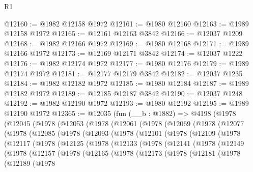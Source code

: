 \begin{lexlean}{R1}
\begin{coremodule}
@12160 := @1982 @12158 @1972
@12161 := @1980 @12160
@12163 := @1989 @12158 @1972
@12165 := @12161 @12163 @3842
@12166 := @12037 @1209
@12168 := @1982 @12166 @1972
@12169 := @1980 @12168
@12171 := @1989 @12166 @1972
@12173 := @12169 @12171 @3842
@12174 := @12037 @1222
@12176 := @1982 @12174 @1972
@12177 := @1980 @12176
@12179 := @1989 @12174 @1972
@12181 := @12177 @12179 @3842
@12182 := @12037 @1235
@12184 := @1982 @12182 @1972
@12185 := @1980 @12184
@12187 := @1989 @12182 @1972
@12189 := @12185 @12187 @3842
@12190 := @12037 @1248
@12192 := @1982 @12190 @1972
@12193 := @1980 @12192
@12195 := @1989 @12190 @1972
@12365 := @12035
    (fun (__b : @1882) =>
    @4198
      (@1978
        (@12045
          (@1978
            (@12053
              (@1978
                (@12061
                  (@1978
                    (@12069
                      (@1978
                        (@12077
                          (@1978
                            (@12085
                              (@1978
                                (@12093
                                  (@1978
                                    (@12101
                                      (@1978
                                        (@12109
                                          (@1978
                                            (@12117
                                              (@1978
                                                (@12125
                                                  (@1978
                                                    (@12133
                                                      (@1978
                                                        (@12141
                                                          (@1978
                                                            (@12149
                                                              (@1978
                                                                (@12157
                                                                  (@1978
                                                                    (@12165
                                                                      (@1978
                                                                        (@12173
                                                                          (@1978
                                                                            (@12181
                                                                              (@1978
                                                                                (@12189
                                                                                  (@1978

\end{coremodule}
\end{lexlean}
